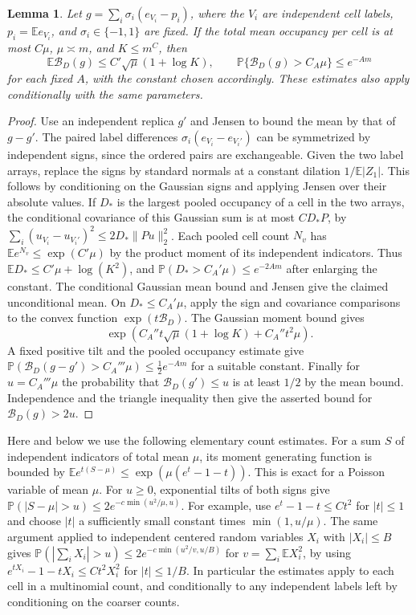 \documentclass[11pt]{article}
\newtheorem{lemma}{Lemma}
\newcommand{\1}{\mathbf{1}}
\numberwithin{equation}{section}
\newcommand{\E}{\mathbb E}
\newcommand{\PP}{\mathbb P}
\begin{document}
\begin{lemma}\label{lem:sc-box-emp}
Let \(g=\sum_i \sigma_i(e_{V_i}-p_i)\), where the \(V_i\)
are independent cell labels, \(p_i=\E e_{V_i}\), and
\(\sigma_i\in\{-1,1\}\) are fixed. If the total mean occupancy
per cell is at most \(C\mu\), \(\mu\asymp m\), and \(K\le m^C\),
then
\[
 \E\mathcal B_D(g)\le C'\sqrt\mu(1+\log K),\qquad
 \PP\{\mathcal B_D(g)>C_A\mu\}\le e^{-A m}
\]
for each fixed \(A\), with the constant chosen accordingly.
These estimates also apply conditionally with the same parameters.
\end{lemma}
\begin{proof}
Use an independent replica \(g'\) and Jensen to bound the
mean by that of \(g-g'\). The paired label differences
\(\sigma_i(e_{V_i}-e_{V_i'})\) can be symmetrized by independent
signs, since the ordered pairs are exchangeable. Given the two
label arrays, replace the signs by standard normals at a
constant dilation \(1/\E|Z_1|\). This follows by conditioning
on the Gaussian signs and applying Jensen over their absolute
values. If \(D_*\) is the largest pooled occupancy of a cell
in the two arrays, the conditional covariance of this Gaussian
sum is at most \(C D_*P\), by
\(\sum_i (u_{V_i}-u_{V_i'})^2\le 2D_*\|Pu\|_2^2\).
Each pooled cell count \(N_v\) has
\(\E e^{N_v}\le\exp(C'\mu)\) by the product moment of its
independent indicators. Thus
\(\E D_*\le C'\mu+\log(K^2)\), and
\(\PP(D_*>C_A'\mu)\le e^{-2A m}\) after enlarging the constant.
The conditional Gaussian mean bound and Jensen give the
claimed unconditional mean. On \(D_*\le C_A'\mu\), apply
the sign and covariance comparisons to the convex function
\(\exp(t\mathcal B_D)\). The Gaussian moment bound gives
\[
 \exp\!\left(C_A''t\sqrt\mu(1+\log K)+C_A''t^2\mu\right).
\]
A fixed positive tilt and the pooled occupancy estimate give
\(\PP(\mathcal B_D(g-g')>C_A'''\mu)\le \tfrac12 e^{-A m}\)
for a suitable constant. Finally for \(u=C_A'''\mu\)
the probability that \(\mathcal B_D(g')\le u\) is at least
\(1/2\) by the mean bound. Independence and the triangle inequality
then give the asserted bound for \(\mathcal B_D(g)>2u\).
\end{proof}

Here and below we use the following elementary count estimates.
For a sum \(S\) of independent indicators of total mean \(\mu\),
its moment generating function is bounded by
\(\E e^{t(S-\mu)}\le\exp(\mu(e^t-1-t))\).
This is exact for a Poisson variable of mean \(\mu\). For
\(u\ge0\), exponential tilts of both signs give
\(\PP(|S-\mu|>u)\le 2e^{-c\min(u^2/\mu,u)}\).
For example, use \(e^t-1-t\le C t^2\) for \(|t|\le1\)
and choose \(|t|\) a sufficiently small constant times
\(\min(1,u/\mu)\). The same argument applied to independent
centered random variables \(X_i\) with \(|X_i|\le B\) gives
\(\PP(|\sum_i X_i|>u)\le 2e^{-c\min(u^2/v,u/B)}\)
for \(v=\sum_i\E X_i^2\), by using
\(e^{tX_i}-1-tX_i\le C t^2 X_i^2\) for \(|t|\le 1/B\).
In particular the estimates apply to each cell in a
multinomial count, and conditionally to any independent
labels left by conditioning on the coarser counts.
\end{document}
